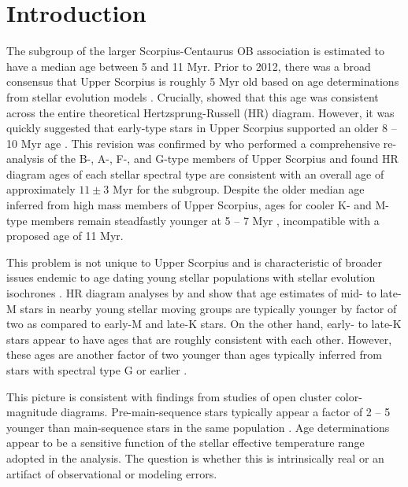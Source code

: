 \documentclass{aa}
\begin{document}
   \maketitle
%

\section{Introduction}
The  subgroup of the larger Scorpius-Centaurus OB association is estimated to have a median age between 5 and 11 Myr. Prior to 2012, there was a broad consensus that Upper Scorpius is roughly 5 Myr old based on age determinations from stellar evolution models \citep{deGeus1992, Preibisch2002, Slesnick2008}. Crucially, \citet{Preibisch2002} showed that this age was consistent across the entire theoretical Hertzsprung-Russell (HR) diagram. However, it was quickly suggested that early-type stars in Upper Scorpius supported an older 8 -- 10 Myr age \citep{Sartori2003}. This revision was confirmed by \citet{Pecaut2012} who performed a comprehensive re-analysis of the B-, A-, F-, and G-type members of Upper Scorpius and found HR diagram ages of each stellar spectral type are consistent with an overall age of approximately $11\pm3$ Myr for the subgroup. Despite the older median age inferred from high mass members of Upper Scorpius, ages for cooler K- and M-type members remain steadfastly younger at 5 -- 7 Myr \citep[][]{Herczeg2015, Rizzuto2015, Rizzuto2015b}, incompatible with a proposed age of 11 Myr.

This problem is not unique to Upper Scorpius and is characteristic of broader issues endemic to age dating young stellar populations with stellar evolution isochrones \citep[e.g.,][]{Naylor2009, Bell2012, Herczeg2015}. HR diagram analyses by \citet{Malo2014} and \citet{Herczeg2015} show that age estimates of mid- to late-M stars in nearby young stellar moving groups are typically younger by factor of two as compared to early-M and late-K stars. On the other hand, early- to late-K stars appear to have ages that are roughly consistent with each other. However, these ages are another factor of two younger than ages typically inferred from stars with spectral type G or earlier \citep{Hillenbrand2008}. 

This picture is consistent with findings from studies of open cluster color-magnitude diagrams. Pre-main-sequence stars typically appear a factor of 2 -- 5 younger than main-sequence stars in the same population \citep{Naylor2009, Bell2012, Bell2013}. Age determinations appear to be a sensitive function of the stellar effective temperature range adopted in the analysis. The question is whether this is intrinsically real or an artifact of observational or modeling errors. 
\end{document}
